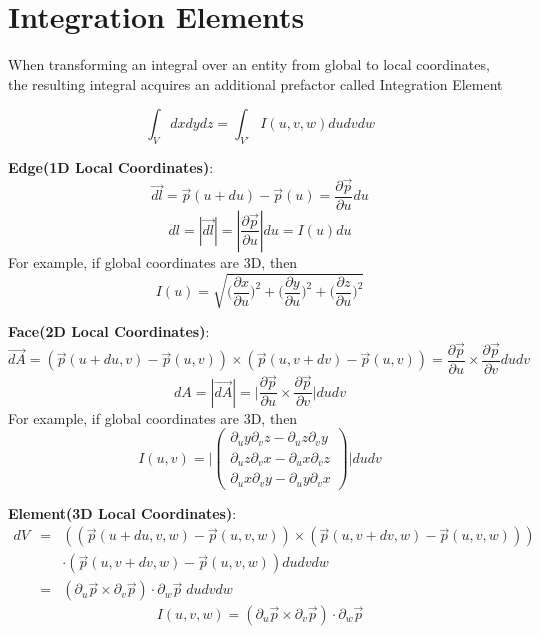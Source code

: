 \section{Integration Elements}

When transforming an integral over an entity from global to local coordinates, the resulting integral acquires an additional prefactor called Integration Element

\[ \int_{V} dx dy dz = \int_{V'} I(u,v,w) du dv dw \]

\noindent
\textbf{Edge(1D Local Coordinates)}:
\[\vec{dl} = \vec{p}(u + du) - \vec{p}(u) = \frac{\partial \vec{p}}{\partial u} du \]
\[dl = |\vec{dl}| = |\frac{\partial \vec{p}}{\partial u}| du = I(u)du \]
For example, if global coordinates are 3D, then
\[I(u) = \sqrt{\bigl (\frac{\partial x}{\partial u})^2 + \bigl (\frac{\partial y}{\partial u})^2 + \bigl (\frac{\partial z}{\partial u})^2} \]

\noindent
\textbf{Face(2D Local Coordinates)}:
\[\vec{dA} = (\vec{p}(u + du, v) - \vec{p}(u, v)) \times (\vec{p}(u, v + dv) - \vec{p}(u, v)) = \frac{\partial \vec{p}}{\partial u} \times \frac{\partial \vec{p}}{\partial v} du dv \]
\[dA = |\vec{dA}| = \bigl | \frac{\partial \vec{p}}{\partial u} \times \frac{\partial \vec{p}}{\partial v} \bigr | du dv \]
For example, if global coordinates are 3D, then
\[I(u,v) = \biggl | \begin{pmatrix}
  \partial_u y \partial_v z - \partial_u z \partial_v y \\
  \partial_u z \partial_v x - \partial_u x \partial_v z \\
  \partial_u x \partial_v y - \partial_u y \partial_v x
\end{pmatrix} \biggr | du dv \]

\noindent
\textbf{Element(3D Local Coordinates)}:
\begin{eqnarray*}
  dV & = & ((\vec{p}(u + du, v, w) - \vec{p}(u, v, w)) \times (\vec{p}(u, v + dv, w) - \vec{p}(u, v, w))) \\
     && \cdot  (\vec{p}(u, v + dv, w) - \vec{p}(u, v, w)) du dv dw  \\
     & = & (\partial_u \vec{p} \times \partial_v \vec{p}) \cdot \partial_w \vec{p} \; du dv dw
\end{eqnarray*}
\[ I(u,v,w) = (\partial_u \vec{p} \times \partial_v \vec{p}) \cdot \partial_w \vec{p} \]

